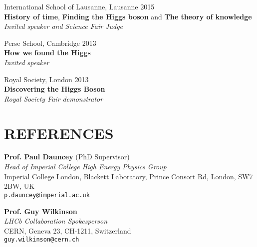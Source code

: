 \documentclass[margin, 10pt]{res} %
\begin{document}
\begin{resume}
International School of Lausanne, Lausanne 2015 \\
\textbf{History of time}, \textbf{Finding the Higgs boson} and \textbf{The theory of knowledge} \\
\textit{Invited speaker and Science Fair Judge}

Perse School, Cambridge 2013 \\
\textbf{How we found the Higgs} \\
\textit{Invited speaker}

Royal Society, London 2013 \\
\textbf{Discovering the Higgs Boson} \\
\textit{Royal Society Fair demonstrator}



\newpage
\section{REFERENCES}
\textbf{Prof. Paul Dauncey} (PhD Supervisor) \\
\textit{Head of Imperial College High Energy Physics Group} \\
Imperial College London, Blackett Laboratory, Prince Consort Rd, London, SW7 2BW, UK \\
\texttt{p.dauncey@imperial.ac.uk}

\textbf{Prof. Guy Wilkinson} \\
\textit{LHCb Collaboration Spokesperson} \\
CERN, Geneva 23, CH-1211, Switzerland \\
\texttt{guy.wilkinson@cern.ch}


\end{resume}
\end{document}

